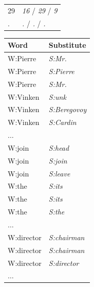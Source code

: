 \begin{table}[ht]
\begin{tabular}{|ll|}
29 & \textit{16} /  \textit{29} / \textit{9}\\
. & \textit{.}  / \textit{.} / \textit{.}\\
\hline
\end{tabular}
\quad
\begin{tabular}{|ll|}
\hline
\textbf{Word} & \textbf{Substitute}\\
\hline
W:Pierre & \textit{S:Mr.}\\
W:Pierre & \textit{S:Pierre}\\
W:Pierre & \textit{S:Mr.}\\
W:Vinken & \textit{S:unk}\\
W:Vinken & \textit{S:Beregovoy}\\
W:Vinken & \textit{S:Cardin}\\
$\hdots$&\\
W:join & \textit{S:head}\\
W:join & \textit{S:join}\\
W:join & \textit{S:leave}\\
W:the & \textit{S:its}\\
W:the & \textit{S:its}\\
W:the & \textit{S:the}\\
$\hdots$&\\
W:director & \textit{S:chairman}\\
W:director & \textit{S:chairman}\\
W:director & \textit{S:director}\\
$\hdots$&\\
\hline
\end{tabular}
\label{tab:samples}
\end{table}

